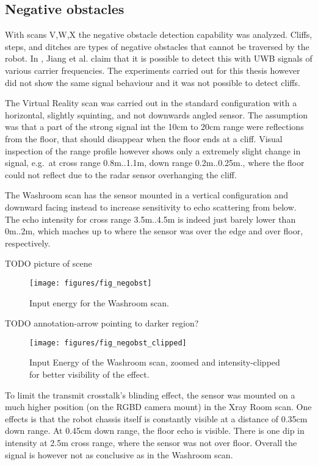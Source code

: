 \subsection{Negative obstacles}\label{negative-obstacles}

With scans V,W,X the negative obstacle detection capability was
analyzed. Cliffs, steps, and ditches are types of negative obstacles
that cannot be traversed by the robot. In \cite{Jiang2015}, Jiang et al.
claim that it is possible to detect this with UWB signals of various
carrier frequencies. The experiments carried out for this thesis however
did not show the same signal behaviour and it was not possible to detect
cliffs.

The Virtual Reality scan was carried out in the standard configuration
with a horizontal, slightly squinting, and not downwards angled sensor.
The assumption was that a part of the strong signal int the 10cm to 20cm
range were reflections from the floor, that should disappear when the
floor ends at a cliff. Visual inspection of the range profile however
shows only a extremely slight change in signal, e.g.~at cross range
0.8m..1.1m, down range 0.2m..0.25m., where the floor could not reflect
due to the radar sensor overhanging the cliff.

The Washroom scan has the sensor mounted in a vertical configuration and
downward facing instead to increase sensitivity to echo scattering from
below. The echo intensity for cross range 3.5m..4.5m is indeed just
barely lower than 0m..2m, which maches up to where the sensor was over
the edge and over floor, respectively.

TODO picture of scene

\begin{figure}[htp]
    \centering
    \texttt{[image: figures/fig\_negobst]}
    \caption{Input energy for the Washroom scan.}
    \label{fig:negobst}
\end{figure}

TODO annotation-arrow pointing to darker region?

\begin{figure}[htp]
    \centering
    \texttt{[image: figures/fig\_negobst\_clipped]}
    \caption{Input Energy of the Washroom scan, zoomed and intensity-clipped for better visibility of the effect.}
    \label{fig:negobst_clipped}
\end{figure}

To limit the transmit crosstalk's blinding effect, the sensor was
mounted on a much higher position (on the RGBD camera mount) in the Xray
Room scan. One effects is that the robot chassis itself is constantly
visible at a distance of 0.35cm down range. At 0.45cm down range, the
floor echo is visible. There is one dip in intensity at 2.5m cross
range, where the sensor was not over floor. Overall the signal is
however not as conclusive as in the Washroom scan.

